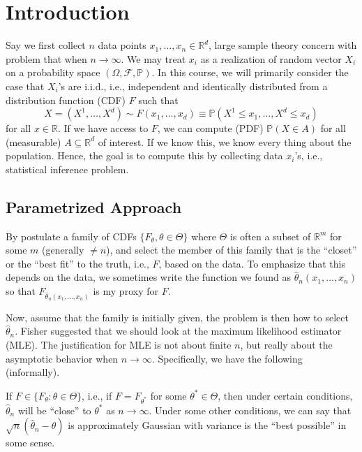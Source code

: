 \chapter{Introduction}
Say we first collect \(n\) data points \(x_1, \dots , x_n \in \mathbb{R} ^d\), large sample theory concern with problem that when \(n \to \infty \). We may treat \(x_i\) as a realization of random vector \(X_i\) on a probability space \((\Omega , \mathscr{F} , \mathbb{P} )\). In this course, we will primarily consider the case that \(X_i\)'s are i.i.d., i.e., independent and identically distributed from a distribution function (CDF) \(F\) such that
\[
	X = (X^1, \dots , X^d) \sim F(x_1, \dots , x_d) \equiv \mathbb{P} (X^1 \leq x_1, \dots , X^d \leq x_d )
\]
for all \(x \in \mathbb{R} \). If we have access to \(F\), we can compute (PDF) \(\mathbb{P} (X \in A)\) for all (measurable) \(A \subseteq \mathbb{R} ^d\) of interest. If we know this, we know every thing about the population. Hence, the goal is to compute this by collecting data \(x_i\)'s, i.e., statistical inference problem.

\section{Parametrized Approach}
By postulate a family of CDFs \(\{ F_\theta , \theta \in \Theta \} \) where \(\Theta \) is often a subset of \(\mathbb{R} ^m\) for some \(m\) (generally \(\neq n\)), and select the member of this family that is the ``closet'' or the ``best fit'' to the truth, i.e., \(F\), based on the data. To emphasize that this depends on the data, we sometimes write the function we found as \(\hat{\theta} _n(x_1, \dots  , x_n)\) so that \(F_{\hat{\theta} _n(x_1, \dots , x_n)} \) is my proxy for \(F\).

Now, assume that the family is initially given, the problem is then how to select \(\hat{\theta} _n\). Fisher suggested that we should look at the maximum likelihood estimator (MLE). The justification for MLE is not about finite \(n\), but really about the asymptotic behavior when \(n \to \infty \). Specifically, we have the following (informally).

\begin{theorem}[Fisher]
	If \(F \in \{ F_\theta \colon \theta \in \Theta \} \), i.e., if \(F = F_{\theta ^{\ast} }\) for some \(\theta ^{\ast} \in \Theta \), then under certain conditions, \(\hat{\theta} _n\) will be ``close'' to \(\theta ^{\ast} \) as \(n \to \infty \). Under some other conditions, we can say that \(\sqrt{n}  (\hat{\theta} _n - \theta )\) is approximately Gaussian with variance is the ``best possible'' in some sense.
\end{theorem}

